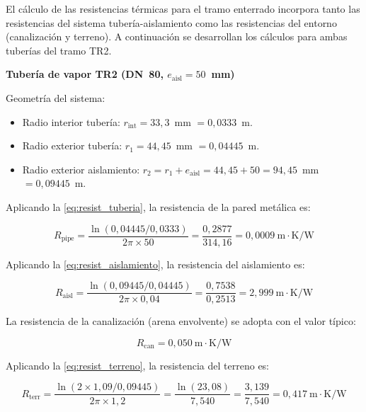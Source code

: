 \documentclass[12pt]{article}
\begin{document}
El cálculo de las resistencias térmicas para el tramo enterrado incorpora tanto las resistencias del sistema tubería-aislamiento como las resistencias del entorno (canalización y terreno). A continuación se desarrollan los cálculos para ambas tuberías del tramo TR2.

\textbf{Tubería de vapor TR2 (DN~80, $e_{\text{aisl}} = 50$~mm)}

Geometría del sistema:

\begin{itemize}[noitemsep]
	\item Radio interior tubería: $r_{\text{int}} = 33{,}3$~mm $= 0{,}0333$~m.
	\item Radio exterior tubería: $r_1 = 44{,}45$~mm $= 0{,}04445$~m.
	\item Radio exterior aislamiento: $r_2 = r_1 + e_{\text{aisl}} = 44{,}45 + 50 = 94{,}45$~mm $= 0{,}09445$~m.
\end{itemize}

Aplicando la \eqref{eq:resist_tuberia}, la resistencia de la pared metálica es:

\begin{equation}
	R_{\text{pipe}} = \frac{\ln(0{,}04445 / 0{,}0333)}{2\pi \times 50} = \frac{0{,}2877}{314{,}16} = 0{,}0009~\text{m}\cdot\text{K/W}
	\label{eq:resist_pipe_TR2_vap}
\end{equation}

Aplicando la \eqref{eq:resist_aislamiento}, la resistencia del aislamiento es:

\begin{equation}
	R_{\text{aisl}} = \frac{\ln(0{,}09445 / 0{,}04445)}{2\pi \times 0{,}04} = \frac{0{,}7538}{0{,}2513} = 2{,}999~\text{m}\cdot\text{K/W}
	\label{eq:resist_aisl_TR2_vap}
\end{equation}

La resistencia de la canalización (arena envolvente) se adopta con el valor típico:

\begin{equation}
	R_{\text{can}} = 0{,}050~\text{m}\cdot\text{K/W}
	\label{eq:resist_can_TR2}
\end{equation}

Aplicando la \eqref{eq:resist_terreno}, la resistencia del terreno es:

\begin{equation}
	R_{\text{terr}} = \frac{\ln(2 \times 1{,}09 / 0{,}09445)}{2\pi \times 1{,}2} = \frac{\ln(23{,}08)}{7{,}540} = \frac{3{,}139}{7{,}540} = 0{,}417~\text{m}\cdot\text{K/W}
	\label{eq:resist_terr_TR2_vap}
\end{equation}
\end{document}
